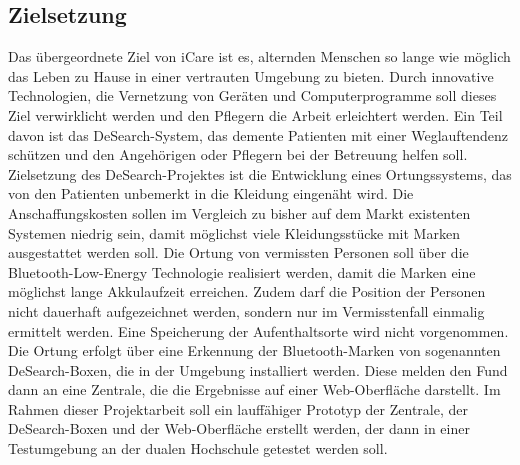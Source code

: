 \subsection{Zielsetzung}
Das übergeordnete Ziel von iCare ist es, alternden Menschen so lange wie möglich das Leben zu Hause in einer vertrauten Umgebung zu bieten. Durch innovative Technologien, die Vernetzung von Geräten und Computerprogramme soll dieses Ziel verwirklicht werden und den Pflegern die Arbeit erleichtert werden. Ein Teil davon ist das DeSearch-System, das demente Patienten mit einer Weglauftendenz schützen und den Angehörigen oder Pflegern bei der Betreuung helfen soll.
Zielsetzung des DeSearch-Projektes ist die Entwicklung eines Ortungssystems, das von den Patienten unbemerkt in die Kleidung eingenäht wird. Die Anschaffungskosten sollen im Vergleich zu bisher auf dem Markt existenten Systemen niedrig sein, damit möglichst viele Kleidungsstücke mit Marken ausgestattet werden soll. Die Ortung von vermissten Personen soll über die Bluetooth-Low-Energy Technologie realisiert werden, damit die Marken eine möglichst lange Akkulaufzeit erreichen. Zudem darf die Position der Personen nicht dauerhaft aufgezeichnet werden, sondern nur im Vermisstenfall einmalig ermittelt werden. Eine Speicherung der Aufenthaltsorte wird nicht vorgenommen. Die Ortung erfolgt über eine Erkennung der Bluetooth-Marken von sogenannten DeSearch-Boxen, die in der Umgebung installiert werden. Diese melden den Fund dann an eine Zentrale, die die Ergebnisse auf einer Web-Oberfläche darstellt. Im Rahmen dieser Projektarbeit soll ein lauffähiger Prototyp der Zentrale, der DeSearch-Boxen und der Web-Oberfläche erstellt werden, der dann in einer Testumgebung an der dualen Hochschule getestet werden soll.
